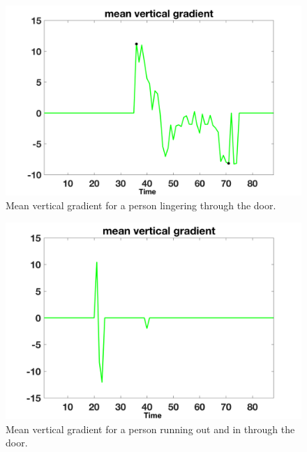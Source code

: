 \documentclass[12pt,oneside]{article} %
\begin{document}
\begin{figure}[!htb]
\centering
\includegraphics[scale=0.52]{images/lingerThrough.png}
\caption{Mean vertical gradient for a person lingering through the door.}
\label{linger}
\end{figure}

\begin{figure}[!htb]
\centering
\includegraphics[scale=0.52]{images/runoutandin.png}
\caption{Mean vertical gradient for a person running out and in through the door.}
\label{run}
\end{figure}
\end{document}
